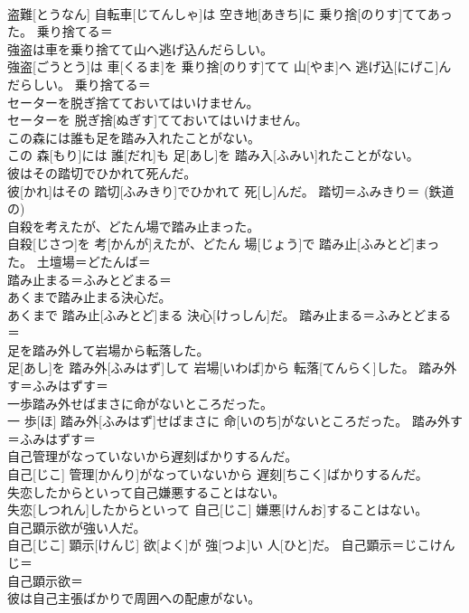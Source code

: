\documentclass[8pt]{extreport}
\begin{document}
\begin{CJK}{UTF8}{min}
{\\	盗難[とうなん] 自転車[じてんしゃ]は 空き地[あきち]に 乗り捨[のりす]ててあった。	乗り捨てる＝ 
\\	強盗は車を乗り捨てて山へ逃げ込んだらしい。	
\\	強盗[ごうとう]は 車[くるま]を 乗り捨[のりす]てて 山[やま]へ 逃げ込[にげこ]んだらしい。	乗り捨てる＝ 
\\	セーターを脱ぎ捨てておいてはいけません。	
\\	セーターを 脱ぎ捨[ぬぎす]てておいてはいけません。	
\\	この森には誰も足を踏み入れたことがない。	
\\	この 森[もり]には 誰[だれ]も 足[あし]を 踏み入[ふみい]れたことがない。	
\\	彼はその踏切でひかれて死んだ。	
\\	彼[かれ]はその 踏切[ふみきり]でひかれて 死[し]んだ。	踏切＝ふみきり＝ (鉄道の) 
\\	自殺を考えたが、どたん場で踏み止まった。	
\\	自殺[じさつ]を 考[かんが]えたが、どたん 場[じょう]で 踏み止[ふみとど]まった。	土壇場＝どたんば＝ 
\\	踏み止まる＝ふみとどまる＝ 
\\	あくまで踏み止まる決心だ。	
\\	あくまで 踏み止[ふみとど]まる 決心[けっしん]だ。	踏み止まる＝ふみとどまる＝ 
\\	足を踏み外して岩場から転落した。	
\\	足[あし]を 踏み外[ふみはず]して 岩場[いわば]から 転落[てんらく]した。	踏み外す＝ふみはずす＝ 
\\	一歩踏み外せばまさに命がないところだった。	
\\	一 歩[ほ] 踏み外[ふみはず]せばまさに 命[いのち]がないところだった。	踏み外す＝ふみはずす＝ 
\\	自己管理がなっていないから遅刻ばかりするんだ。	
\\	自己[じこ] 管理[かんり]がなっていないから 遅刻[ちこく]ばかりするんだ。	
\\	失恋したからといって自己嫌悪することはない。	
\\	失恋[しつれん]したからといって 自己[じこ] 嫌悪[けんお]することはない。	
\\	自己顕示欲が強い人だ。	
\\	自己[じこ] 顕示[けんじ] 欲[よく]が 強[つよ]い 人[ひと]だ。	自己顕示＝じこけんじ＝ 
\\	自己顕示欲＝ 
\\	彼は自己主張ばかりで周囲への配慮がない。	
}
\end{CJK}
\end{document}
